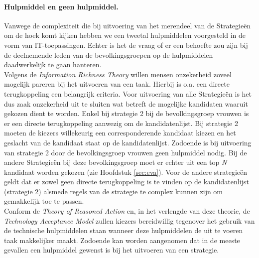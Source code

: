 \paragraph{Hulpmiddel en geen hulpmiddel.} 
Vanwege de complexiteit die bij uitvoering van het merendeel van de Strategie\"{e}n om de hoek komt kijken hebben we een tweetal hulpmiddelen voorgesteld in de vorm van IT-toepassingen. Echter is het de vraag of er een behoefte zou zijn bij de deelnemende leden van de bevolkingsgroepen op de hulpmiddelen daadwerkelijk te gaan hanteren. \\
\indent Volgens de \textit{Information Richness Theory} \citep{daft1983information} willen mensen onzekerheid zoveel mogelijk pareren bij het uitvoeren van een taak. Hierbij is o.a. een directe terugkoppeling een belangrijk criteria. Voor uitvoering van alle Strategie\"{e}n is het dus zaak onzekerheid uit te sluiten wat betreft de mogelijke kandidaten waaruit gekozen dient te worden. Enkel bij strategie 2 bij de bevolkingsgroep vrouwen is er een directe terugkoppeling aanwezig om de kandidatenlijst. Bij strategie 2 moeten de kiezers willekeurig een corresponderende kandidaat kiezen en het geslacht van de kandidaat staat op de kandidatenlijst. Zodoende is bij uitvoering van strategie 2 door de bevolkingsgroep vrouwen geen hulpmiddel nodig. Bij de andere Strategie\"{e}n bij deze bevolkingsgroep moet er echter uit een top \textit{N} kandidaat worden gekozen (zie Hoofdstuk \ref{sec:eva}). Voor de andere strategie\"{e}n geldt dat er zowel geen directe terugkoppeling is te vinden op de kandidatenlijst (strategie 2) alsmede regels van de strategie te complex kunnen zijn om gemakkelijk toe te passen. \\
\indent Conform de \textit{Theory of Reasoned Action} \citep{fishbein1977belief,ajzen1991theory} en, in het verlengde van deze theorie, de \textit{Technology Acceptance Model} \citep{davis1989perceived,davis1989user, venkatesh2000determinants} zullen kiezers bereidwillig tegenover het gebruik van de technische hulpmiddelen staan wanneer deze hulpmiddelen de uit te voeren taak makkelijker maakt. Zodoende kan worden aangenomen dat in de meeste gevallen een hulpmiddel gewenst is bij het uitvoeren van een strategie. 


